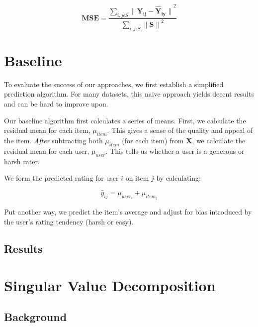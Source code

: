 \documentclass[12pt]{article}
\begin{document}
$$ \mathbf{MSE} = \frac{\sum\limits_{i,j \epsilon S} {\mathbf{\|Y_{ij} - \hat{Y}_{iy}\|}}^2}{\sum\limits_{i,j \epsilon S}{\mathbf{\|S\|}}^2} $$

\section{Baseline}
To evaluate the success of our approaches, we first establish a simplified prediction algorithm. For many datasets, this naive approach yields decent results and can be hard to improve upon.

Our baseline algorithm first calculates a series of means. First, we calculate the residual mean for each item, $\mu_{item}$. This gives a sense of the quality and appeal of the item. \textit{After} subtracting both $\mu_{item}$ (for each item) from $\mathbf{X}$, we calculate the residual mean for each user, $\mu_{user}$. This tells us whether a user is a generous or harsh rater.

We form the predicted rating for user $i$ on item $j$ by calculating:

$$\hat y_{ij} = \mu_{user_i} + \mu_{item_j}$$

Put another way, we predict the item's average and adjust for bias introduced by the user's rating tendency (harsh or easy).

\subsection{Results}

\section{Singular Value Decomposition}
\subsection{Background}
\end{document}

